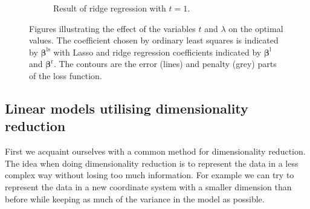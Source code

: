 \documentclass[a4paper, 12pt]{scrartcl}
\newcommand{\bfbeta}{\boldsymbol{\beta}}
\begin{document}
\begin{figure}[h]
\begin{subfigure}{.5\textwidth}
		\label{fig:ridgepenalty}
		\caption{Result of ridge regression with $t=1$.}
	\end{subfigure}
	\caption{Figures illustrating the effect of the variables $t$ and $\lambda$ on the optimal values.
	The coefficient chosen by ordinary least squares is indicated by $\bfbeta^\mathrm{ls}$ with Lasso and ridge regression coefficients indicated by $\bfbeta^\mathrm{l}$ and $\bfbeta^\mathrm{r}$.
	The contours are the error (lines) and penalty (grey) parts of the loss function.}
\label{fig:fig}
\end{figure}


\subsection{Linear models utilising dimensionality reduction}
First we acquaint ourselves with a common method for dimensionality reduction.
The idea when doing dimensionality reduction is to represent the data in a less complex way without losing too much information.
For example we can try to represent the data in a new coordinate system with a smaller dimension than before while keeping as much of the variance in the model as possible.
\end{document}
